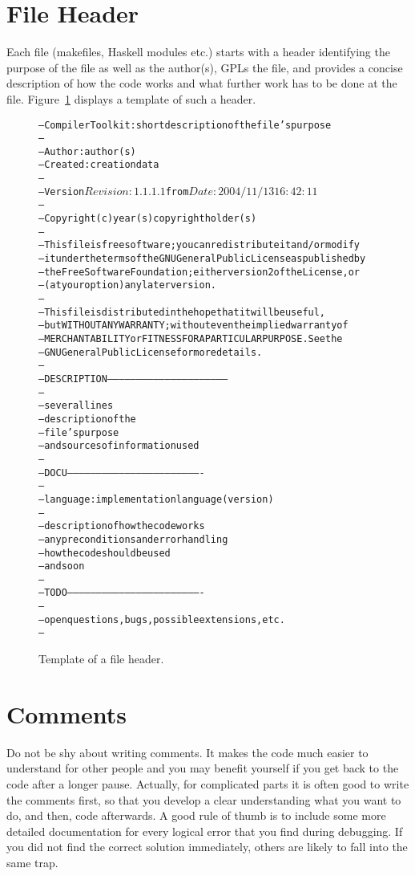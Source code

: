 \documentclass{report}
\newcommand{\schema}[1]{\textrm{#1}}
\begin{document}
\section{File Header}

Each file (makefiles, Haskell modules etc.) starts with a header identifying
the purpose of the file as well as the author(s), GPLs the file, and
provides a concise description of how the code works and what further work
has to be done at the file.  Figure~\ref{fig:file-header} displays a template
of such a header.
%
\begin{figure}
\begin{alltt}
--  Compiler Toolkit: \schema{short description of the file's purpose}
--
--  Author : \schema{author(s)}
--  Created: \schema{creation data}
--
--  Version $Revision: 1.1.1.1 $ from $Date: 2004/11/13 16:42:11 $
--
--  Copyright (c) \schema{year(s)} \schema{copyright holder(s)}
--
--  This file is free software; you can redistribute it and/or modify
--  it under the terms of the GNU General Public License as published by
--  the Free Software Foundation; either version 2 of the License, or
--  (at your option) any later version.
--
--  This file is distributed in the hope that it will be useful,
--  but WITHOUT ANY WARRANTY; without even the implied warranty of
--  MERCHANTABILITY or FITNESS FOR A PARTICULAR PURPOSE.  See the
--  GNU General Public License for more details.
--
--- DESCRIPTION ---------------------------------------------------------------
--
--  \schema{several lines}
--  \schema{description of the}
--  \schema{file's purpose}
--  \schema{and sources of information used}
--
--- DOCU ----------------------------------------------------------------------
--
--  language: \schema{implementation language (version)}
--
--  \schema{description of how the code works}
--  \schema{any preconditions and error handling}
--  \schema{how the code should be used}
--  \schema{and so on}
--
--- TODO ----------------------------------------------------------------------
--
--  \schema{open questions, bugs, possible extensions, etc.}
--
\end{alltt}
\caption{Template of a file header.}
\label{fig:file-header}
\end{figure}


\section{Comments}

Do not be shy about writing comments.  It makes the code much easier to
understand for other people and you may benefit yourself if you get back to
the code after a longer pause.  Actually, for complicated parts it is often
good to write the comments first, so that you develop a clear understanding
what you want to do, and then, code afterwards.  A good rule of thumb is to
include some more detailed documentation for every logical error that you find
during debugging.  If you did not find the correct solution immediately,
others are likely to fall into the same trap.
\end{document}
